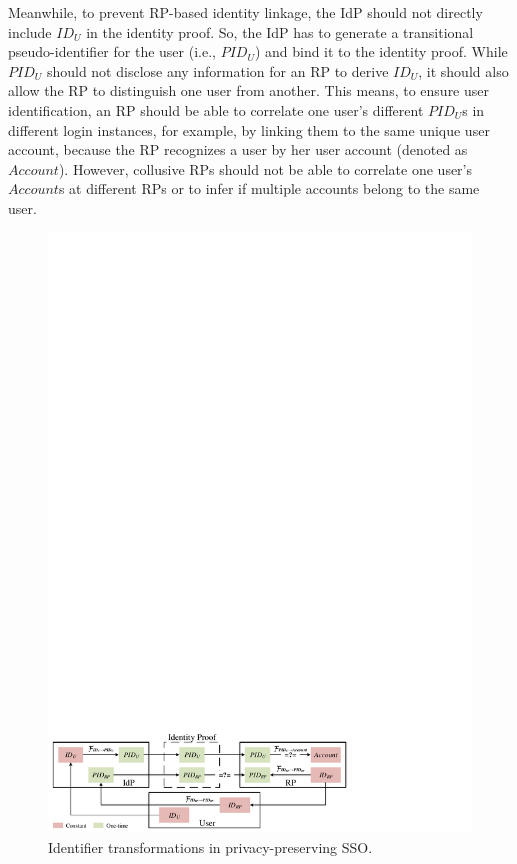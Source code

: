 Meanwhile, to prevent RP-based identity linkage, the IdP should not directly include $ID_U$ in the identity proof. So, the IdP has to generate a transitional pseudo-identifier for the user (i.e., $PID_U$) and bind it to the identity proof. While $PID_U$ should not disclose any information for an RP to derive $ID_U$, it should also allow the RP to distinguish one user from another. This means, to ensure user identification, an RP should be able to correlate one user's different $PID_U$s in different login instances, for example, by linking them to the same unique user account, because the RP recognizes a user by her user account (denoted as $Account$). However, collusive RPs should not be able to correlate one user's $Account$s at different RPs or to infer if multiple accounts belong to the same user.

\begin{figure}
  \centering
  \includegraphics[width=\linewidth]{fig/IDCorrelation.pdf}
  \caption{Identifier transformations in privacy-preserving SSO.}
  \label{fig:IDCorrelation}
  \vspace{-5mm}
\end{figure}


